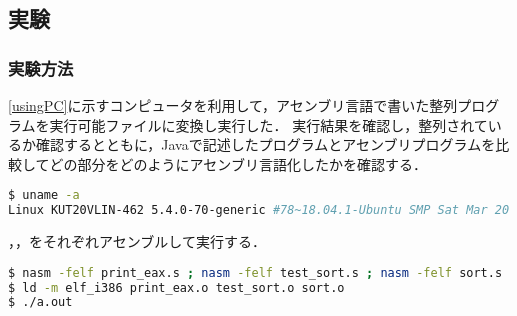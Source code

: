 \subsection{実験}
\subsubsection{実験方法}
\ref{usingPC}に示すコンピュータを利用して，アセンブリ言語で書いた整列プログラムを実行可能ファイルに変換し実行した．
実行結果を確認し，整列されているか確認するとともに，{\ttfamily Java}で記述したプログラムとアセンブリプログラムを比較してどの部分をどのようにアセンブリ言語化したかを確認する．
\begin{lstlisting}[frame={single},numbers={none},breakindent={0pt},language={Bash},caption={使用したコンピュータ},label={usingPC}]
$ uname -a
Linux KUT20VLIN-462 5.4.0-70-generic #78~18.04.1-Ubuntu SMP Sat Mar 20 14:10:07 UTC 2021 x86_64 x86_64 x86_64 GNU/Linux
\end{lstlisting}
，\testsort，をそれぞれアセンブルして実行する．
\begin{lstlisting}[frame={single},numbers={none},breakindent={0pt},language={Bash},caption={実行したコマンド}]
$ nasm -felf print_eax.s ; nasm -felf test_sort.s ; nasm -felf sort.s
$ ld -m elf_i386 print_eax.o test_sort.o sort.o
$ ./a.out
\end{lstlisting}
